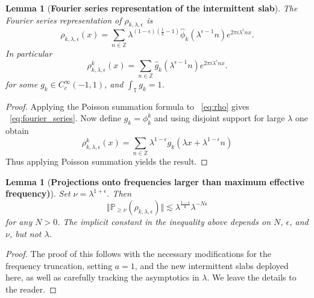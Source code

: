 \documentclass[12pt,reqno,letterpaper]{amsart}
\numberwithin{equation}{section}
\newcommand{\1}{{\bf 1}}
\newcommand{\2}{{\bf 2}}
\newcommand{\T}{\mathbb T}
\newcommand{\Z}{\mathbb Z}
\newtheorem{lemma}[theorem]{Lemma}
\theoremstyle{remark}
\theoremstyle{remark}
\begin{document}
\begin{lemma}[\textbf{Fourier series representation of the intermittent slab}]\label{lem:fourier}
    The Fourier series representation of $\rho_{k,\lambda,\epsilon}$ is
    \begin{equation}\label{eq:fourier_series}
        \rho_{k,\lambda,\epsilon}(x) = \sum_{n \in \Z} \lambda^{(1-\epsilon)\left(\frac{1}{k} - 1\right)} \hat{\phi}_k\left(\lambda^{\epsilon-1}n\right) e^{2\pi i \lambda^{\epsilon}  n x}.
    \end{equation}
    In particular 
    \begin{equation}\label{eq:fourier_series rho k}
        \rho_{k, \lambda, \epsilon}^k(x) = \sum_{n \in \Z} \hat{g}_k(\lambda^{\epsilon - 1} n) e^{2\pi i \lambda^\epsilon n x}.
    \end{equation}
    for some $g_k \in C_c^\infty(-1, 1)$, and $\int_\T g_k = 1$.
\end{lemma}
\begin{proof}
    Applying the Poisson summation formula to ~\eqref{eq:rho} gives ~\eqref{eq:fourier_series}. Now define $g_k = \phi_k^k$ and using disjoint support for large $\lambda$ one obtain 
    \[\rho_{k, \lambda, \epsilon}^k(x) = \sum_{n \in \Z} \lambda^{1 - \epsilon} g_k(\lambda x + \lambda^{1 - \epsilon}n)\]
    Thus applying Poisson summation yields the result.
\end{proof}

\begin{lemma}[\textbf{Projections onto frequencies larger than maximum effective frequency)}]\label{lem:freq_proj_rho}
    Set $\nu = \lambda^{1 + \epsilon}$. Then
    $$
    \Vert \mathbb{P}_{\geq \nu}(\rho_{k,\lambda,\epsilon}) \Vert \lesssim \lambda^{\frac{1-\epsilon}{k}} \lambda^{-N\epsilon}
    $$
    for any $N > 0$. The implicit constant in the inequality above depends on $N$, $\epsilon$, and $\nu$, but not $\lambda$.
\end{lemma}
\begin{proof}
    The proof of this follows \cite[Lemma 2.10]{Pathak} with the necessary modifications for the frequency truncation, setting $a = 1$, and the new intermittent slabs deployed here, as well as carefully tracking the asymptotics in $\lambda$. We leave the details to the reader.
\end{proof}
\end{document}
